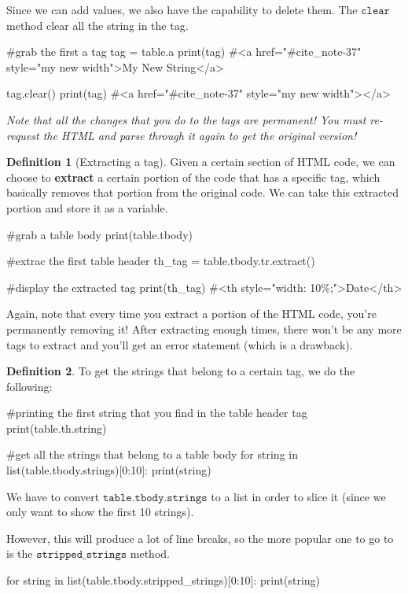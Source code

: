 \documentclass[a4paper, 12pt]{report}
\theoremstyle{remark}
\theoremstyle{definition}
\newtheorem{definition}{Definition}[section]
\begin{document}
Since we can add values, we also have the capability to delete them. The $\texttt{clear}$ method clear all the string in the tag. 
\begin{python}
#grab the first a tag
tag = table.a
print(tag)
#<a href="#cite_note-37" style="my new width">My New String</a>

tag.clear()
print(tag)
#<a href="#cite_note-37" style="my new width"></a>
\end{python}

\textit{Note that all the changes that you do to the tags are permanent! You must re-request the HTML and parse through it again to get the original version!}

\begin{definition}[Extracting a tag]
Given a certain section of HTML code, we can choose to \textbf{extract} a certain portion of the code that has a specific tag, which basically removes that portion from the original code. We can take this extracted portion and store it as a variable.
\begin{python}
#grab a table body
print(table.tbody)

#extrac the first table header 
th_tag = table.tbody.tr.extract()

#display the extracted tag
print(th_tag)
#<th style="width: 10\%;">Date</th>
\end{python}
Again, note that every time you extract a portion of the HTML code, you're permanently removing it! After extracting enough times, there won't be any more tags to extract and you'll get an error statement (which is a drawback). 
\end{definition}

\begin{definition}
To get the strings that belong to a certain tag, we do the following: 
\begin{python}
#printing the first string that you find in the table header tag
print(table.th.string)  

#get all the strings that belong to a table body
for string in list(table.tbody.strings)[0:10]: 
    print(string)
\end{python}
We have to convert $\texttt{table.tbody.strings}$ to a list in order to slice it (since we only want to show the first 10 strings). 

However, this will produce a lot of line breaks, so the more popular one to go to is the $\texttt{stripped\_strings}$ method. 
\begin{python}
for string in list(table.tbody.stripped_strings)[0:10]: 
    print(string)
\end{python}
\end{definition}
\end{document}
